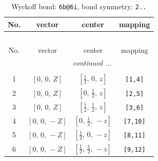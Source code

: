 \documentclass[fleqn,8pt]{jsarticle}
\begin{document}
\begin{longtable}{cccc}
\caption{Wyckoff bond: {\tt 6b@6i}, bond symmetry: {\tt 2..}}
 \\
 \hline \hline
No. & vector & center & mapping \\ \hline \endfirsthead

\multicolumn{3}{l}{\tablename\ \thetable{}} \\
 \hline \hline
No. & vector & center & mapping \\ \hline \endhead

 \hline \hline
\multicolumn{3}{r}{\footnotesize\it continued ...} \\ \endfoot

 \hline \hline
\multicolumn{3}{r}{} \\ \endlastfoot

1 & $\left[ 0,\, 0,\, Z \right]$ & $\left[ \frac{1}{2},\, 0,\, z \right]$ & {\tt [1,4]} \\ \hline
2 & $\left[ 0,\, 0,\, Z \right]$ & $\left[ 0,\, \frac{1}{2},\, z \right]$ & {\tt [2,5]} \\ \hline
3 & $\left[ 0,\, 0,\, Z \right]$ & $\left[ \frac{1}{2},\, \frac{1}{2},\, z \right]$ & {\tt [3,6]} \\ \hline
4 & $\left[ 0,\, 0,\, - Z \right]$ & $\left[ 0,\, \frac{1}{2},\, - z \right]$ & {\tt [7,10]} \\ \hline
5 & $\left[ 0,\, 0,\, - Z \right]$ & $\left[ \frac{1}{2},\, 0,\, - z \right]$ & {\tt [8,11]} \\ \hline
6 & $\left[ 0,\, 0,\, - Z \right]$ & $\left[ \frac{1}{2},\, \frac{1}{2},\, - z \right]$ & {\tt [9,12]} \\
\end{longtable}
\renewcommand{\arraystretch}{1.2}
\end{document}
